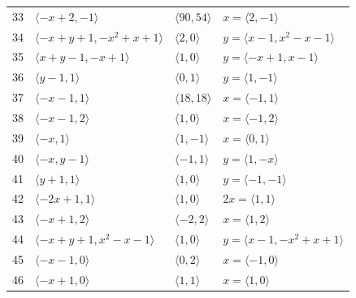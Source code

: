 \documentclass[11pt]{article}
\begin{document}
\begin{longtable}{@{}rlll@{}}
33 & $\langle -x+2,-1\rangle$ & $\langle 90,54\rangle$ & $x=\langle 2,-1\rangle$\\
34 & $\langle -x+y+1,-x^{2}+x+1\rangle$ & $\langle 2,0\rangle$ & $y=\langle x-1,x^{2}-x-1\rangle$\\
35 & $\langle x+y-1,-x+1\rangle$ & $\langle 1,0\rangle$ & $y=\langle -x+1,x-1\rangle$\\
36 & $\langle y-1,1\rangle$ & $\langle 0,1\rangle$ & $y=\langle 1,-1\rangle$\\
37 & $\langle -x-1,1\rangle$ & $\langle 18,18\rangle$ & $x=\langle -1,1\rangle$\\
38 & $\langle -x-1,2\rangle$ & $\langle 1,0\rangle$ & $x=\langle -1,2\rangle$\\
39 & $\langle -x,1\rangle$ & $\langle 1,-1\rangle$ & $x=\langle 0,1\rangle$\\
40 & $\langle -x,y-1\rangle$ & $\langle -1,1\rangle$ & $y=\langle 1,-x\rangle$\\
41 & $\langle y+1,1\rangle$ & $\langle 1,0\rangle$ & $y=\langle -1,-1\rangle$\\
42 & $\langle -2x+1,1\rangle$ & $\langle 1,0\rangle$ & $2x=\langle 1,1\rangle$\\
43 & $\langle -x+1,2\rangle$ & $\langle -2,2\rangle$ & $x=\langle 1,2\rangle$\\
44 & $\langle -x+y+1,x^{2}-x-1\rangle$ & $\langle 1,0\rangle$ & $y=\langle x-1,-x^{2}+x+1\rangle$\\
45 & $\langle -x-1,0\rangle$ & $\langle 0,2\rangle$ & $x=\langle -1,0\rangle$\\
46 & $\langle -x+1,0\rangle$ & $\langle 1,1\rangle$ & $x=\langle 1,0\rangle$\\
\end{longtable}
\endgroup
\end{document}
